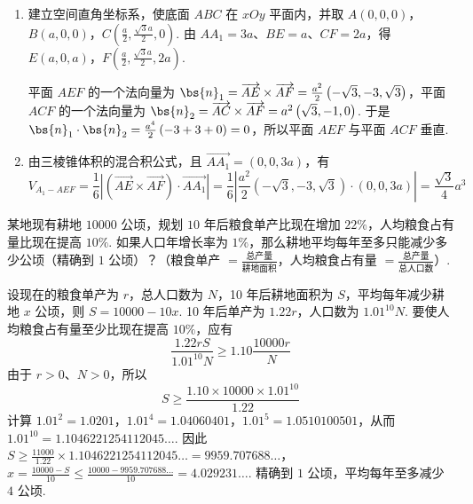 \documentclass[UTF8,a4paper,oneside,11pt]{ctexbook}
\begin{document}
\begin{solution}
\begin{enumerate}
\item 建立空间直角坐标系，使底面 \(ABC\) 在 \(xOy\) 平面内，并取 \(A\left(0,0,0\right)\)，\(B\left(a,0,0\right)\)，\(C\left(\frac{a}{2},\frac{\sqrt{3}a}{2},0\right)\). 由 \(AA_1=3a\)、\(BE=a\)、\(CF=2a\)，得 \(E\left(a,0,a\right)\)，\(F\left(\frac{a}{2},\frac{\sqrt{3}a}{2},2a\right)\).

平面 \(AEF\) 的一个法向量为 \(\bs{n}_1=\overrightarrow{AE}\times\overrightarrow{AF}=\frac{a^2}{2}\left(-\sqrt{3},-3,\sqrt{3}\right)\)，平面 \(ACF\) 的一个法向量为 \(\bs{n}_2=\overrightarrow{AC}\times\overrightarrow{AF}=a^2\left(\sqrt{3},-1,0\right)\). 于是 \(\bs{n}_1\cdot\bs{n}_2=\frac{a^4}{2}\left(-3+3+0\right)=0\)，所以平面 \(AEF\) 与平面 \(ACF\) 垂直.

\item 由三棱锥体积的混合积公式，且 \(\overrightarrow{AA_1}=\left(0,0,3a\right)\)，有
\[
V_{A_1-AEF}=\frac{1}{6}\left|\left(\overrightarrow{AE}\times\overrightarrow{AF}\right)\cdot\overrightarrow{AA_1}\right|=\frac{1}{6}\left|\frac{a^2}{2}\left(-\sqrt{3},-3,\sqrt{3}\right)\cdot\left(0,0,3a\right)\right|=\frac{\sqrt{3}}{4}a^3
\]
\end{enumerate}
\end{solution}

\begin{problem}
某地现有耕地 \(10000\text{ 公顷}\)，规划 \(10\text{ 年}\)后粮食单产比现在增加 \(22\%\)，人均粮食占有量比现在提高 \(10\%\). 如果人口年增长率为 \(1\%\)，那么耕地平均每年至多只能减少多少公顷（精确到 \(1\text{ 公顷}\)）？（粮食单产 \(= \frac{\text{总产量}}{\text{耕地面积}}\)，人均粮食占有量 \(= \frac{\text{总产量}}{\text{总人口数}}\)）.
\end{problem}

\begin{solution}
设现在的粮食单产为 \(r\)，总人口数为 \(N\)，10 年后耕地面积为 \(S\)，平均每年减少耕地 \(x\) 公顷，则 \(S=10000-10x\). 10 年后单产为 \(1.22r\)，人口数为 \(1.01^{10}N\). 要使人均粮食占有量至少比现在提高 \(10\%\)，应有
\[
\frac{1.22rS}{1.01^{10}N}\geqslant1.10\frac{10000r}{N}
\]
由于 \(r>0\)、\(N>0\)，所以
\[
S\geqslant\frac{1.10\times10000\times1.01^{10}}{1.22}
\]
计算 \(1.01^2=1.0201\)，\(1.01^4=1.04060401\)，\(1.01^5=1.0510100501\)，从而 \(1.01^{10}=1.1046221254112045\ldots\). 因此
\(S\geqslant\frac{11000}{1.22}\times1.1046221254112045\ldots=9959.707688\ldots\)，\(x=\frac{10000-S}{10}\leqslant\frac{10000-9959.707688\ldots}{10}=4.029231\ldots\).
精确到 \(1\) 公顷，平均每年至多减少 \(4\) 公顷.
\end{solution}
\end{document}
